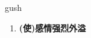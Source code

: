 
\begin{frame}
{\huge gush}
\begin{center}
\begin{enumerate}\Large
  \item \textbf{(使)感情强烈外溢}
\end{enumerate}
\end{center}
\end{frame}
